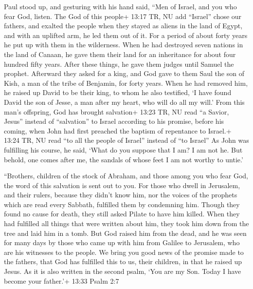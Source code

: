  Paul stood up, and gesturing with his hand said, ``Men of
Israel, and you who fear God, listen.  The God of this
people+ 13:17 TR, NU add ``Israel'' chose our fathers, and exalted the
people when they stayed as aliens in the land of Egypt, and with an
uplifted arm, he led them out of it.  For a period of about
forty years he put up with them in the wilderness.  When he
had destroyed seven nations in the land of Canaan, he gave them their
land for an inheritance for about four hundred fifty years.
 After these things, he gave them judges until Samuel the
prophet.  Afterward they asked for a king, and God gave to
them Saul the son of Kish, a man of the tribe of Benjamin, for forty
years.  When he had removed him, he raised up David to be
their king, to whom he also testified, `I have found David the son of
Jesse, a man after my heart, who will do all my will.' 
From this man's offspring, God has brought salvation+ 13:23 TR, NU read
``a Savior, Jesus'' instead of ``salvation'' to Israel according to his
promise,  before his coming, when John had first preached
the baptism of repentance to Israel.+ 13:24 TR, NU read ``to all the
people of Israel'' instead of ``to Israel''  As John was
fulfilling his course, he said, `What do you suppose that I am? I am not
he. But behold, one comes after me, the sandals of whose feet I am not
worthy to untie.'

 ``Brothers, children of the stock of Abraham, and those
among you who fear God, the word of this salvation is sent out to you.
 For those who dwell in Jerusalem, and their rulers,
because they didn't know him, nor the voices of the prophets which are
read every Sabbath, fulfilled them by condemning him. 
Though they found no cause for death, they still asked Pilate to have
him killed.  When they had fulfilled all things that were
written about him, they took him down from the tree and laid him in a
tomb.  But God raised him from the dead,  and
he was seen for many days by those who came up with him from Galilee to
Jerusalem, who are his witnesses to the people.  We bring
you good news of the promise made to the fathers,  that God
has fulfilled this to us, their children, in that he raised up Jesus. As
it is also written in the second psalm, `You are my Son. Today I have
become your father.'+ 13:33 Psalm 2:7

